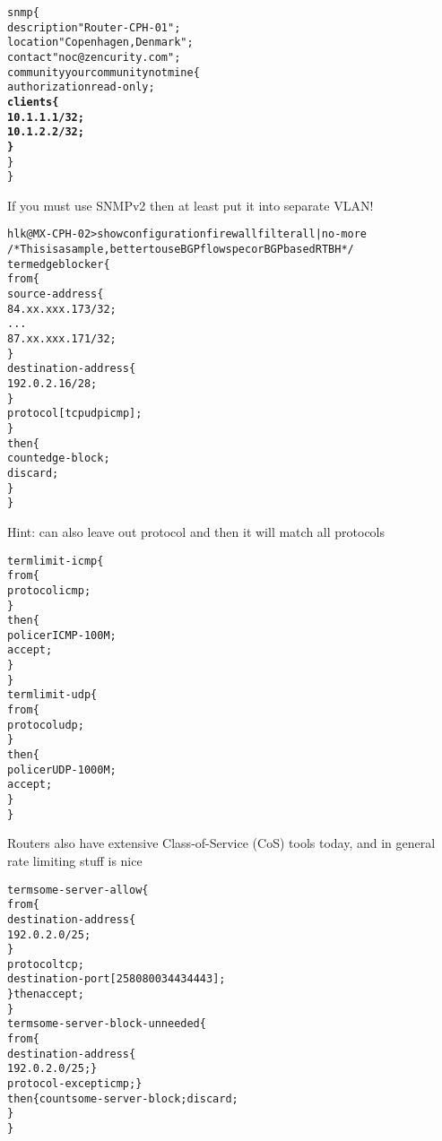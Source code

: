 \documentclass[Screen16to9,17pt]{foils}
\begin{document}

\begin{alltt}\footnotesize
snmp \{
    description "Router-CPH-01";
    location "Copenhagen, Denmark";
    contact "noc@zencurity.com";
    community yourcommunitynotmine \{
        authorization read-only;
        {\bf clients \{
               10.1.1.1/32;
               10.1.2.2/32;
        \}    }
    \}
\}
\end{alltt}

If you must use SNMPv2 then at least put it into separate VLAN! {\myalert}




\begin{alltt}\footnotesize
hlk@MX-CPH-02> show configuration firewall filter all | no-more
/* This is a sample, better to use BGP flowspec or BGP based RTBH */
term edgeblocker \{
    from \{
        source-address \{
            84.xx.xxx.173/32;
...
            87.xx.xxx.171/32;
        \}
        destination-address \{
            192.0.2.16/28;
        \}
        protocol [ tcp udp icmp ];
    \}
    then \{
        count edge-block;
        discard;
    \}
\}
\end{alltt}
Hint: can also leave out protocol and then it will match all protocols


\begin{alltt}\footnotesize
term limit-icmp \{
    from \{
        protocol icmp;
    \}
    then \{
        policer ICMP-100M;
        accept;
    \}
\}
term limit-udp \{
    from \{
        protocol udp;
    \}
    then \{
        policer UDP-1000M;
        accept;
    \}
\}
\end{alltt}

Routers also have extensive Class-of-Service (CoS) tools today, and in general rate limiting stuff is nice


\begin{alltt}\footnotesize
term some-server-allow \{
    from \{
        destination-address \{
            192.0.2.0/25;
        \}
        protocol tcp;
        destination-port [ 25 80 8003 443 4443 ];
    \} then accept;
\}
term some-server-block-unneeded \{
    from \{
        destination-address \{
            192.0.2.0/25; \}
        protocol-except icmp;  \}
    then \{ count some-server-block; discard;
    \}
\}
\end{alltt}
\end{document}

